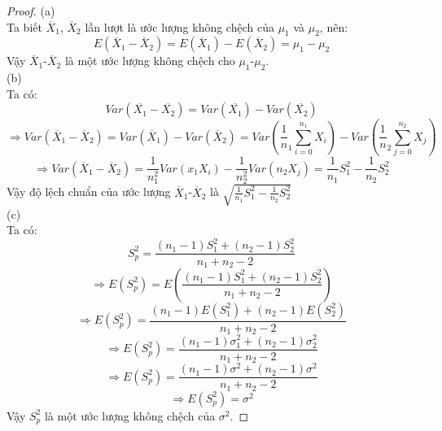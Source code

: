 \begin{proof}
(a)\\
Ta biết $\overline{X}_1$, $\overline{X}_2$ lần lượt là ước lượng không chệch của $\mu_1$ và $\mu_2$, nên:
\begin{equation*}
{E(\overline{X}_1-\overline{X}_2) = E(\overline{X}_1)-E(\overline{X}_2) = \mu_1-\mu_2}
\end{equation*}
Vậy $\overline{X}_1$-$\overline{X}_2$ là một ước lượng không chệch cho $\mu_1$-$\mu_2$.\\
(b)\\
Ta có:
\begin{equation*}
Var(\overline{X_1}-\overline{X_2}) = Var(\overline{X_1})-Var(\overline{X_2})
\end{equation*}
\begin{equation*}
\Rightarrow Var(\overline{X}_1-\overline{X}_2) = Var(\overline{X}_1)-Var(\overline{X}_2) =  Var(\frac1n_1\sum_{i=0}^{n_1}X_i)-Var(\frac1n_2\sum_{j=0}^{n_2}X_j)
\end{equation*}
\begin{equation*}
\Rightarrow Var(\overline{X}_1-\overline{X}_2) = \frac{1}{n^2_1}Var(x_1X_i)-\frac{1}{n^2_2}Var(n_2X_j) = \frac{1}{n_1}S^2_1-\frac{1}{n_2}S^2_2 
\end{equation*}
Vậy độ lệch chuẩn của ước lượng $\overline{X}_1$-$\overline{X}_2$ là $\sqrt{\frac{1}{n_1}S^2_1-\frac{1}{n_2}S^2_2}$\\
(c)\\
Ta có:
\begin{equation*}
S^2_p = \dfrac{(n_1-1)S^2_1+(n_2-1)S^2_2}{n_1+n_2-2}
\end{equation*}
\begin{equation*}
\Rightarrow E(S^2_p) = E(\dfrac{(n_1-1)S^2_1+(n_2-1)S^2_2}{n_1+n_2-2})
\end{equation*}
\begin{equation*}
\Rightarrow E(S^2_p) = \dfrac{(n_1-1)E(S^2_1)+(n_2-1)E(S^2_2)}{n_1+n_2-2}
\end{equation*}
\begin{equation*}
\Rightarrow E(S^2_p) = \dfrac{(n_1-1)\sigma_1^2+(n_2-1)\sigma_2^2}{n_1+n_2-2}
\end{equation*}
\begin{equation*}
\Rightarrow E(S^2_p) = \dfrac{(n_1-1)\sigma^2+(n_2-1)\sigma^2}{n_1+n_2-2} 
\end{equation*}
\begin{equation*}
\Rightarrow E(S^2_p) = \sigma^2
\end{equation*}
Vậy $S^2_p$ là một ước lượng không chệch của  $\sigma^2$.
\end{proof}
